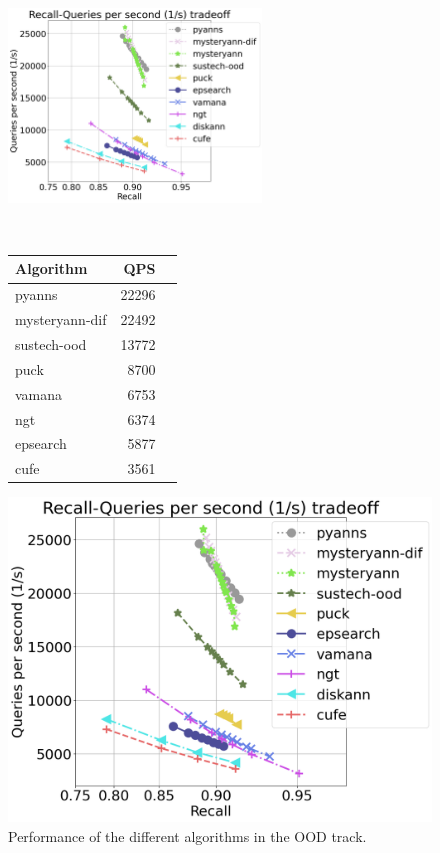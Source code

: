 \begin{figure}[t]
\begin{minipage}[b]{0.7\textwidth}
\centering
\includegraphics[width=0.6\textwidth]{fig/text2image-10M.png}
    \label{fig:ood_results}    
\end{minipage}
~
\begin{minipage}[b]{0.28\textwidth}
\centering
\small
\begin{tabular}{lrr}
\hline
Algorithm & QPS \\
\hline
pyanns &  22296 \\
mysteryann-dif & 22492 \\
sustech-ood  & 13772\\
puck & 8700 \\ 
vamana & 6753 \\
ngt &  6374 \\
epsearch & 5877 \\
cufe &  3561 \\
\hline
\end{tabular}
\label{tab:ood}
\end{minipage}
\end{figure}

\fi 


\ifarxiv

\begin{figure}
\centering
\includegraphics[width=0.9\linewidth]{fig/text2image-10M.png}
    \caption{Performance of the different algorithms in the OOD track.}
    \label{fig:ood_results}    
\end{figure}

